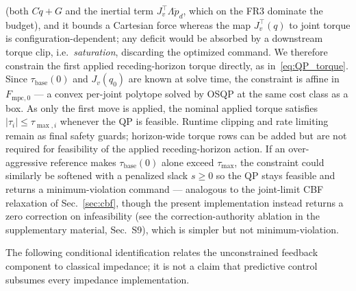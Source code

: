 \documentclass[journal]{IEEEtran}
\newcommand{\Fmpck}[1]{F_{\text{mpc},#1}}
\begin{document}
(both $C\dot{q}+G$ and the inertial term $J_v^\top\Lambda\ddot{p}_d$, which on
the FR3 dominate the budget), and it bounds a Cartesian force whereas the map
$J_v^\top(q)$ to joint torque is configuration-dependent; any deficit would
be absorbed by a downstream torque clip, i.e.\ \emph{saturation}, discarding
the optimized command. We therefore constrain the first applied
receding-horizon torque directly, as in~\eqref{eq:QP_torque}. Since
$\tau_{\text{base}}(0)$ and $J_v(q_0)$ are known at solve time, the constraint
is affine in $\Fmpck{0}$ --- a convex per-joint polytope solved by OSQP at the
same cost class as a box. As only the first move is applied, the nominal
applied torque satisfies $|\tau_i|\leq\tau_{\max,i}$ whenever the QP is
feasible. Runtime clipping and rate limiting remain as final safety guards;
horizon-wide torque rows can be added but are not required for feasibility of
the applied receding-horizon action. If an over-aggressive reference makes
$\tau_{\text{base}}(0)$ alone exceed $\tau_{\max}$, the constraint could
similarly be softened with a penalized slack $s\geq0$ so the QP stays
feasible and returns a minimum-violation command --- analogous to the
joint-limit CBF relaxation of Sec.~\ref{sec:cbf}, though the present
implementation instead returns a zero correction on infeasibility (see the
correction-authority ablation in the supplementary material, Sec.~S9),
which is simpler but not minimum-violation.

The following conditional identification relates the unconstrained feedback
component to classical impedance; it is not a claim that predictive control
subsumes every impedance implementation.
\end{document}
